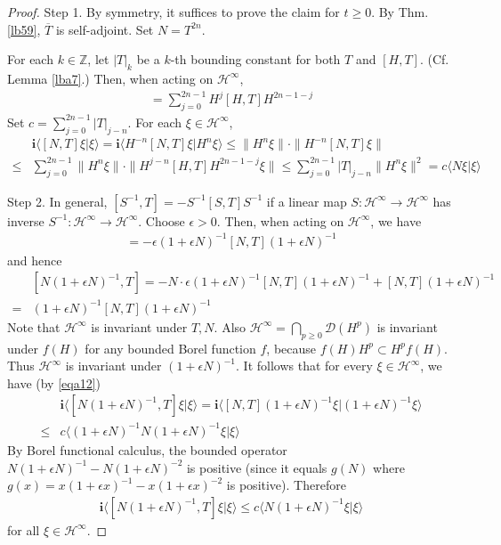 \documentclass[12pt,b5paper,notitlepage]{article}
\theoremstyle{definition}
\theoremstyle{plain}
\newcommand{\mc}{\mathcal}
\newcommand{\ovl}{\overline}
\newcommand{\Dom}{\scr{D}}
\newcommand{\bk}[1]{\langle {#1}\rangle}
\newcommand{\scr}{\mathscr}
\newcommand{\im}{\mathbf{i}}
\newcommand{\Zbb}{\mathbb Z}
\numberwithin{equation}{section}
\begin{document}
\begin{proof}
Step 1. By symmetry, it suffices to prove the claim for $t\geq 0$. By Thm. \ref{lb59}, $\ovl T$ is self-adjoint. Set $N=T^{2n}$. 

For each $k\in\Zbb$, let $|T|_k$ be a $k$-th bounding constant for both $T$ and $[H,T]$. (Cf. Lemma \ref{lba7}.) Then, when acting on $\mc H^\infty$, 
\begin{align*}
	[N,T]=\sum_{j=0}^{2n-1}H^j[H,T]H^{2n-1-j}
\end{align*}
Set $c=\sum_{j=0}^{2n-1}|T|_{j-n}$. For each $\xi\in\mc H^\infty$,  
\begin{align*}
	&\im \bk{[N,T]\xi|\xi}=\im \bk{H^{-n}[N,T]\xi|H^n\xi}\leq \lVert H^n\xi \lVert\cdot \lVert H^{-n}[N,T]\xi \lVert\\
\leq&\sum_{j=0}^{2n-1}	\lVert H^n\xi \lVert\cdot\lVert H^{j-n}[H,T]H^{2n-1-j}\xi \lVert\leq \sum_{j=0}^{2n-1}	|T|_{j-n}	\lVert H^n\xi \lVert^2 = c\bk{N\xi|\xi}\tag{a}\label{eqa12}
\end{align*}


Step 2. In general,  $[S^{-1},T]=-S^{-1}[S,T]S^{-1}$ if a linear map $S:\mc H^\infty\rightarrow\mc H^\infty$  has inverse $S^{-1}:\mc H^\infty\rightarrow\mc H^\infty$. Choose $\epsilon>0$. Then, when acting on $\mc H^\infty$, we have
\begin{align*}
	[(1+\epsilon N)^{-1},T]=-\epsilon (1+\epsilon N)^{-1}[N,T](1+\epsilon N)^{-1}
\end{align*}
and hence
\begin{align*}
	&[N(1+\epsilon N)^{-1},T]=-N\cdot \epsilon (1+\epsilon N)^{-1}[N,T](1+\epsilon N)^{-1}+[N,T](1+\epsilon N)^{-1}\\
	=&	(1+\epsilon N)^{-1}[N,T](1+\epsilon N)^{-1}
\end{align*}
Note that $\mc H^\infty$ is invariant under $T,N$. Also $\mc H^\infty=\bigcap_{p\geq0}\Dom(H^p)$ is invariant under $f(H)$ for any bounded Borel function $f$, because $f(H)H^p\subset H^pf(H)$. Thus $\mc H^\infty$ is invariant under $(1+\epsilon N)^{-1}$. It follows that for every $\xi\in\mc H^\infty$, we have (by \eqref{eqa12})
\begin{align*}
&\im\bk{[N(1+\epsilon N)^{-1},T]\xi|\xi}=\im\bk{[N,T](1+\epsilon N)^{-1}\xi|(1+\epsilon N)^{-1}\xi}\\
\leq &c\bk{(1+\epsilon N)^{-1}N(1+\epsilon N)^{-1}\xi|\xi}
\end{align*}
By Borel functional calculus, the bounded operator $N(1+\epsilon N)^{-1}-N(1+\epsilon N)^{-2}$ is positive (since it equals $g(N)$ where $g(x)=x(1+\epsilon x)^{-1}-x(1+\epsilon x)^{-2}$ is positive). Therefore
\begin{align*}
\im\bk{[N(1+\epsilon N)^{-1},T]\xi|\xi}\leq 	c\bk{N(1+\epsilon N)^{-1}\xi|\xi}\tag{b}\label{eqa13}
\end{align*}
for all $\xi\in\mc H^\infty$.


\end{proof}
\end{document}
